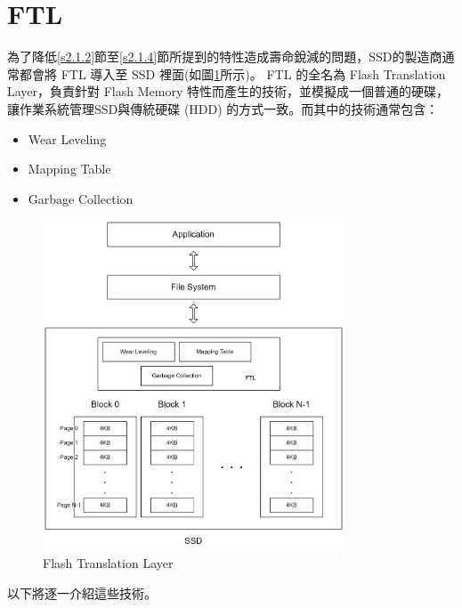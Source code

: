 \section{FTL}\label{s2.2}
\indent
為了降低\ref{s2.1.2}節至\ref{s2.1.4}節所提到的特性造成壽命銳減的問題，SSD的製造商通常都會將 FTL 導入至 SSD 裡面(如圖\ref{f2.4}所示)。
FTL 的全名為 Flash Translation Layer，負責針對 Flash Memory 特性而產生的技術，並模擬成一個普通的硬碟，讓作業系統管理SSD與傳統硬碟 (HDD) 的方式一致。而其中的技術通常包含：\cite{Boukhobza2014ASA}
\begin{itemize}
    \item Wear Leveling
    \item Mapping Table
    \item Garbage Collection
\end{itemize}
\begin{figure}[H]
    \centering
    \includegraphics[width=0.8\textwidth]{picture/ch2/FTL.png}
    \caption{Flash Translation Layer}
    \label{f2.4}
\end{figure}
以下將逐一介紹這些技術。

